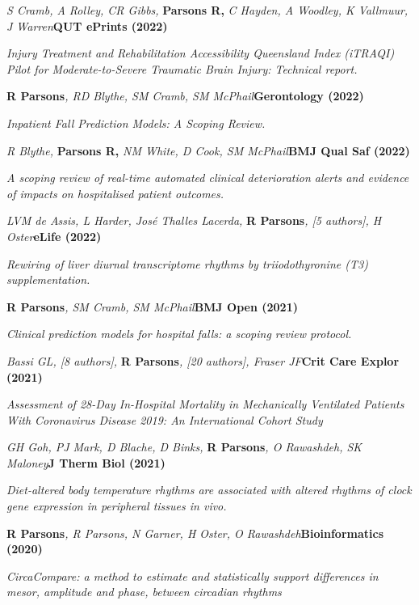 \item
    \textit{S Cramb, A Rolley, CR Gibbs, }\textbf{Parsons R, }\textit{C Hayden, A Woodley, K Vallmuur, J Warren}\textbf{\hfill{QUT ePrints (2022)}}\par
	\textit{Injury Treatment and Rehabilitation Accessibility Queensland Index (iTRAQI) Pilot for Moderate-to-Severe \newline Traumatic Brain Injury: Technical report.}
\item
    \textbf{R Parsons}\textit{, RD Blythe, SM Cramb, SM McPhail}\textbf{\hfill Gerontology (2022)}\par
	\textit{Inpatient Fall Prediction Models: A Scoping Review.}
\item
	\textit{R Blythe, }\textbf{Parsons R, }\textit{NM White, D Cook, SM McPhail}\textbf{\hfill{BMJ Qual Saf (2022)}}\par
	\textit{A scoping review of real-time automated clinical deterioration alerts and evidence of impacts on hospitalised patient outcomes.}
\item
	\textit{LVM de Assis, L Harder, José Thalles Lacerda, }\textbf{R Parsons}\textit{, [5 authors], H Oster}\textbf{\hfill eLife (2022)}\par 
    \textit{Rewiring of liver diurnal transcriptome rhythms by triiodothyronine (T3) supplementation.}
\item
    \textbf{R Parsons}\textit{, SM Cramb, SM McPhail}\textbf{\hfill BMJ Open (2021)}\par 
    \textit{Clinical prediction models for hospital falls: a scoping review protocol.}
\item
    \textit{Bassi GL, [8 authors], }\textbf{R Parsons}\textit{, [20 authors], Fraser JF}\textbf{\hfill Crit Care Explor (2021)}\par 
    \textit{Assessment of 28-Day In-Hospital Mortality in Mechanically Ventilated Patients With Coronavirus Disease 2019: An International Cohort Study}
\item
    \textit{GH Goh, PJ Mark, D Blache, D Binks, }\textbf{R Parsons}\textit{, O Rawashdeh, SK Maloney}\textbf{\hfill J Therm Biol (2021)}\par 
    \textit{Diet-altered body temperature rhythms are associated with altered rhythms of clock gene expression in peripheral tissues in vivo.}
\item
    \textbf{R Parsons}\textit{, R Parsons, N Garner, H Oster, O Rawashdeh}\textbf{\hfill Bioinformatics (2020)}\par 
    \textit{CircaCompare: a method to estimate and statistically support differences in mesor, amplitude and phase, between circadian rhythms}
